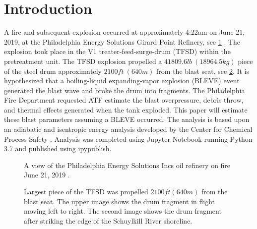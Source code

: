 \documentclass[10pt,parskip=half,
toc=sectionentrywithdots,
bibliography=totocnumbered,
captions=tableheading,numbers=noendperiod]{scrartcl}
\begin{document}
    \begingroup
    \let\cleardoublepage\relax
    \let\clearpage\relax\tableofcontents\listoffigures\listoftables
    \endgroup

\hypertarget{introduction}{%
\section{Introduction}\label{introduction}}

A fire and subsequent explosion occurred at approximately 4:22am on June
21, 2019, at the Philadelphia Energy Solutions Girard Point Refinery,
see \cref{fig:fire} \cite{Renshaw2019}. The explosion took place in the
V1 treater-feed-surge-drum (TFSD) within the pretreatment unit. The TFSD
explosion propelled a \(41809.6lb\:(18964.5kg)\) piece of the steel drum
approximately \(2100ft\:(640m)\) from the blast seat, see
\cref{fig:tank}. It is hypothesized that a boiling-liquid
expanding-vapor explosion (BLEVE) event generated the blast wave and
broke the drum into fragments. The Philadelphia Fire Department
requested ATF estimate the blast overpressure, debris throw, and thermal
effects generated when the tank exploded. This paper will estimate these
blast parameters assuming a BLEVE occurred. The analysis is based upon
an adiabatic and isentropic energy analysis developed by the Center for
Chemical Process Safety \cite{Safety2010}. Analysis was completed using
Jupyter Notebook running Python 3.7 and published using
ipypublish\cite{Sewell2019}\cite{Kluyver2019}.

\begin{figure}[H]
\hypertarget{fig:fire}{%
\begin{center}
\end{center}
\caption{A view of the Philadelphia Energy Solutions Incs oil refinery on fire
June 21, 2019 \cite{Maykuth2019}.}\label{fig:fire}
}
\end{figure}

    \begin{figure}[H]\begin{center}\end{center}\caption{Largest piece of the TFSD was propelled \(2100ft (640m)\) from the blast
seat. The upper image shows the drum fragment in flight moving left to
right. The second image shows the drum fragment after striking the edge
of the Schuylkill River shoreline.}\label{fig:tank}\end{figure}
\end{document}
